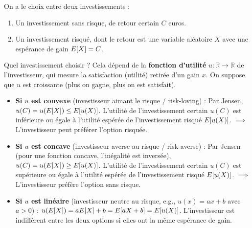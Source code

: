 \begin{exemple}
On a le choix entre deux investissements :
\begin{enumerate}
    \item Un investissement sans risque, de retour certain $C$ euros.
    \item Un investissement risqué, dont le retour est une variable aléatoire $X$ avec une espérance de gain $E[X] = C$.
\end{enumerate}

Quel investissement choisir ? Cela dépend de la \textbf{fonction d'utilité} $u : \mathbb{R} \to \mathbb{R}$ de l'investisseur, qui mesure la satisfaction (utilité) retirée d'un gain $x$. On suppose que $u$ est croissante (plus on gagne, plus on est satisfait).

\begin{itemize}
    \item \textbf{Si $u$ est convexe} (investisseur aimant le risque / risk-loving) : Par Jensen, $u(C) = u(E[X]) \le E[u(X)]$. L'utilité de l'investissement certain $u(C)$ est inférieure ou égale à l'utilité espérée de l'investissement risqué $E[u(X)]$. $\implies$ L'investisseur peut préférer l'option risquée.
    
    \item \textbf{Si $u$ est concave} (investisseur averse au risque / risk-averse) : Par Jensen (pour une fonction concave, l'inégalité est inversée), $u(C) = u(E[X]) \ge E[u(X)]$. L'utilité de l'investissement certain $u(C)$ est supérieure ou égale à l'utilité espérée de l'investissement risqué $E[u(X)]$. $\implies$ L'investisseur préfère l'option sans risque.
    
    \item \textbf{Si $u$ est linéaire} (investisseur neutre au risque, e.g., $u(x) = ax + b$ avec $a > 0$) : $u(E[X]) = aE[X] + b = E[aX + b] = E[u(X)]$. L'investisseur est indifférent entre les deux options si elles ont la même espérance de gain.
\end{itemize}

\begin{center}
\end{center}
\end{exemple}
